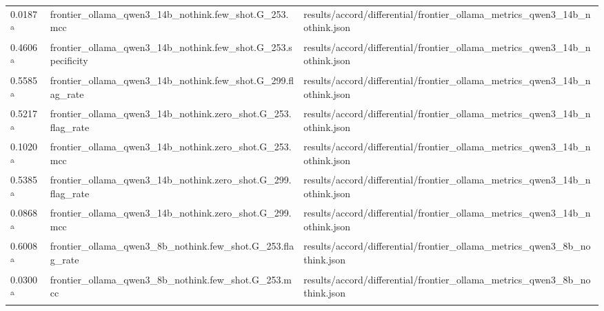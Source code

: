\begin{longtable}{@{}p{0.7in}p{1.9in}p{2.6in}@{}}
0.0187 \textsuperscript{a} & frontier\_ollama\_qwen3\_14b\_nothink.\allowbreak{}few\_shot.\allowbreak{}G\_253.\allowbreak{}mcc & results/\allowbreak{}accord/\allowbreak{}differential/\allowbreak{}frontier\_ollama\_metrics\_qwen3\_14b\_nothink.\allowbreak{}json\\
0.4606 \textsuperscript{a} & frontier\_ollama\_qwen3\_14b\_nothink.\allowbreak{}few\_shot.\allowbreak{}G\_253.\allowbreak{}specificity & results/\allowbreak{}accord/\allowbreak{}differential/\allowbreak{}frontier\_ollama\_metrics\_qwen3\_14b\_nothink.\allowbreak{}json\\
0.5585 \textsuperscript{a} & frontier\_ollama\_qwen3\_14b\_nothink.\allowbreak{}few\_shot.\allowbreak{}G\_299.\allowbreak{}flag\_rate & results/\allowbreak{}accord/\allowbreak{}differential/\allowbreak{}frontier\_ollama\_metrics\_qwen3\_14b\_nothink.\allowbreak{}json\\
0.5217 \textsuperscript{a} & frontier\_ollama\_qwen3\_14b\_nothink.\allowbreak{}zero\_shot.\allowbreak{}G\_253.\allowbreak{}flag\_rate & results/\allowbreak{}accord/\allowbreak{}differential/\allowbreak{}frontier\_ollama\_metrics\_qwen3\_14b\_nothink.\allowbreak{}json\\
0.1020 \textsuperscript{a} & frontier\_ollama\_qwen3\_14b\_nothink.\allowbreak{}zero\_shot.\allowbreak{}G\_253.\allowbreak{}mcc & results/\allowbreak{}accord/\allowbreak{}differential/\allowbreak{}frontier\_ollama\_metrics\_qwen3\_14b\_nothink.\allowbreak{}json\\
0.5385 \textsuperscript{a} & frontier\_ollama\_qwen3\_14b\_nothink.\allowbreak{}zero\_shot.\allowbreak{}G\_299.\allowbreak{}flag\_rate & results/\allowbreak{}accord/\allowbreak{}differential/\allowbreak{}frontier\_ollama\_metrics\_qwen3\_14b\_nothink.\allowbreak{}json\\
0.0868 \textsuperscript{a} & frontier\_ollama\_qwen3\_14b\_nothink.\allowbreak{}zero\_shot.\allowbreak{}G\_299.\allowbreak{}mcc & results/\allowbreak{}accord/\allowbreak{}differential/\allowbreak{}frontier\_ollama\_metrics\_qwen3\_14b\_nothink.\allowbreak{}json\\
0.6008 \textsuperscript{a} & frontier\_ollama\_qwen3\_8b\_nothink.\allowbreak{}few\_shot.\allowbreak{}G\_253.\allowbreak{}flag\_rate & results/\allowbreak{}accord/\allowbreak{}differential/\allowbreak{}frontier\_ollama\_metrics\_qwen3\_8b\_nothink.\allowbreak{}json\\
0.0300 \textsuperscript{a} & frontier\_ollama\_qwen3\_8b\_nothink.\allowbreak{}few\_shot.\allowbreak{}G\_253.\allowbreak{}mcc & results/\allowbreak{}accord/\allowbreak{}differential/\allowbreak{}frontier\_ollama\_metrics\_qwen3\_8b\_nothink.\allowbreak{}json\\

\end{longtable}
